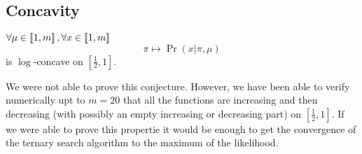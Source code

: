 \subsection{Concavity}

\begin{conjecture}
    \label{thm:log_likelihood_concave_appendix}
    $\forall \mu \in \left\llbracket1, m\right\rrbracket, \forall x \in \left\llbracket1, m\right\rrbracket$
    \[ \pi \mapsto \Pr(x | \pi, \mu) \]
    is $\log$-concave on $\left[\frac{1}{2}, 1\right]$.
\end{conjecture}

We were not able to prove this conjecture. However, we have been able to verify numerically upt to $m=20$ that all the functions are increasing and then decreasing (with possibly an empty increasing or decreasing part) on $\left[\frac{1}{2}, 1\right]$. If we were able to prove this propertie it would be enough to get the convergence of the ternary search algorithm to the maximum of the likelihood.

